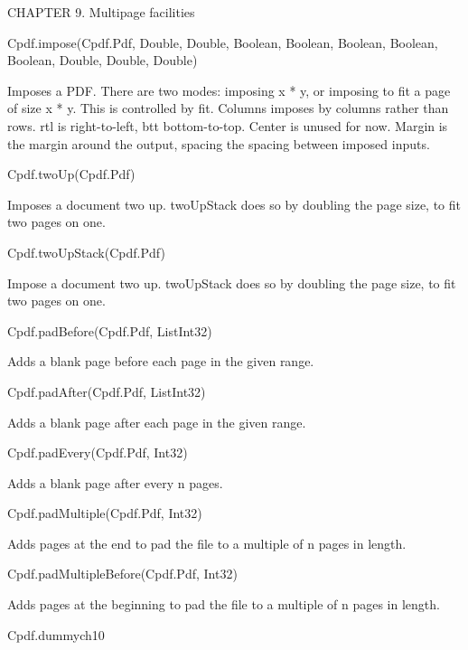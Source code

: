 CHAPTER 9. Multipage facilities

Cpdf.impose(Cpdf.Pdf, Double, Double, Boolean, Boolean, Boolean, Boolean, Boolean, Double, Double, Double)

Imposes a PDF. There are two modes: imposing x * y, or imposing
to fit a page of size x * y. This is controlled by fit. Columns imposes by
columns rather than rows. rtl is right-to-left, btt bottom-to-top. Center is
unused for now. Margin is the margin around the output, spacing the spacing
between imposed inputs.

Cpdf.twoUp(Cpdf.Pdf)

Imposes a document two up. twoUpStack does so by doubling the
page size, to fit two pages on one.

Cpdf.twoUpStack(Cpdf.Pdf)

Impose a document two up. twoUpStack does so by doubling the
page size, to fit two pages on one.

Cpdf.padBefore(Cpdf.Pdf, List{Int32})

Adds a blank page before each page in the given
range.

Cpdf.padAfter(Cpdf.Pdf, List{Int32})

Adds a blank page after each page in the given
range.

Cpdf.padEvery(Cpdf.Pdf, Int32)

Adds a blank page after every n pages.

Cpdf.padMultiple(Cpdf.Pdf, Int32)

Adds pages at the end to pad the file to a
multiple of n pages in length.

Cpdf.padMultipleBefore(Cpdf.Pdf, Int32)

Adds pages at the beginning to pad the file to a
multiple of n pages in length.

Cpdf.dummych10

